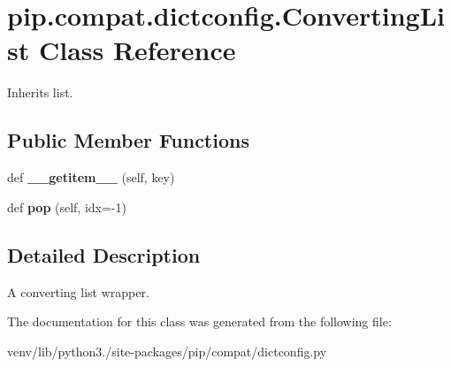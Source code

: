 \hypertarget{classpip_1_1compat_1_1dictconfig_1_1_converting_list}{}\section{pip.\+compat.\+dictconfig.\+Converting\+List Class Reference}
\label{classpip_1_1compat_1_1dictconfig_1_1_converting_list}


Inherits list.

\subsection*{Public Member Functions}
\begin{DoxyCompactItemize}
\item 
\mbox{\label{classpip_1_1compat_1_1dictconfig_1_1_converting_list_aac509beeebaa1da7873aa5a8d9bd034c}} 
def {\bfseries \+\_\+\+\_\+getitem\+\_\+\+\_\+} (self, key)
\item 
\mbox{\label{classpip_1_1compat_1_1dictconfig_1_1_converting_list_a92c423e83eef3864e91a03db610da00a}} 
def {\bfseries pop} (self, idx=-\/1)
\end{DoxyCompactItemize}


\subsection{Detailed Description}
\begin{DoxyVerb}A converting list wrapper.\end{DoxyVerb}
 

The documentation for this class was generated from the following file\+:\begin{DoxyCompactItemize}
\item 
venv/lib/python3./site-\/packages/pip/compat/dictconfig.\+py\end{DoxyCompactItemize}

